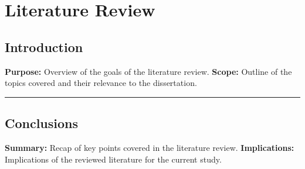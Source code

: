 \section{Literature Review}\label{section:Literature_Review}
\subsection{Introduction}
\textbf{Purpose:} Overview of the goals of the literature review.\newline
\textbf{Scope:} Outline of the topics covered and their relevance to the dissertation.\newline
\noindent\rule{\textwidth}{0.1pt}


\newpage



\subsection{Conclusions}
\textbf{Summary:} Recap of key points covered in the literature review.\newline
\textbf{Implications:} Implications of the reviewed literature for the current study.\newline